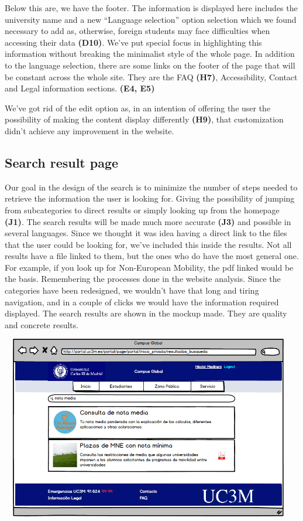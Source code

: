\documentclass{article}
\begin{document}
Below this are, we have the footer. The information is displayed here includes the university name and a new “Language selection” option selection which we found necessary to add as, otherwise, foreign students may face difficulties when accessing their data \textbf{(D10)}. We’ve put special focus in highlighting this information without breaking the minimalist style of the whole page. In addition to the language selection, there are some links on the footer of the page that will be constant across the whole site. They are the FAQ  \textbf{(H7)}, Accessibility, Contact and Legal information sections. \textbf{(E4, E5)}

We’ve got rid of the edit option as, in an intention of offering the user the possibility of making the content display differently \textbf{(H9)}, that customization didn’t achieve any improvement in the website.


\subsection{Search result page}
Our goal in the design of the search is to minimize the number of steps needed to retrieve the information the user is looking for. Giving the possibility of jumping from subcategories to direct results or simply looking up from the homepage \textbf{(J1)}. The search results will be made much more accurate \textbf{(J3)} and possible in several languages. Since we thought it was idea having a direct link to the files that the user could be looking for, we’ve included this inside the results. Not all results have a file linked to them, but the ones who do have the most general one. For example, if you look up for Non-European Mobility, the pdf linked would be the basis.
Remembering the processes done in the website analysis. Since the categories have been redesigned, we wouldn’t have that long and tiring navigation, and in a couple of clicks we would have the information required displayed. The search results are shown in the mockup made. They are quality and concrete results.

\begin{center}
\includegraphics[width=13cm, height=8cm, keepaspectratio]{mockup_results}
\end{center}
\end{document}
